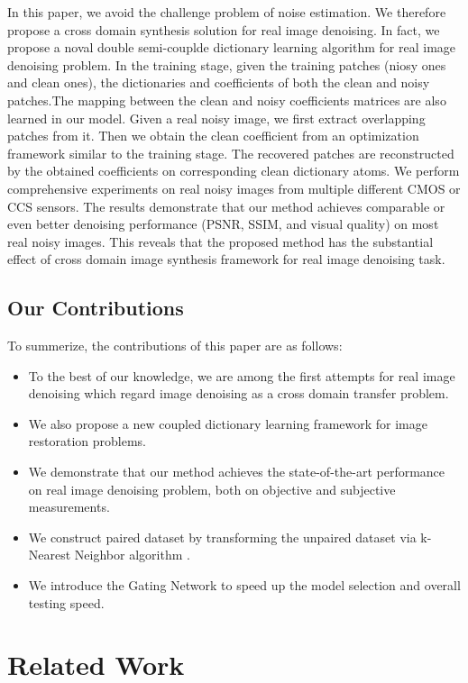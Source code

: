 \documentclass[10pt,twocolumn,letterpaper]{article}
\begin{document}
In this paper, we avoid the challenge problem of noise estimation. We therefore propose a cross domain synthesis solution for real image denoising. In fact, we propose a noval double semi-couplde dictionary learning algorithm for real image denoising problem. In the training stage, given the training patches (niosy ones and clean ones), the dictionaries and coefficients of both the clean and noisy patches.The mapping between the clean and noisy coefficients matrices are also learned in our model. Given a real noisy image, we first extract overlapping patches from it. Then we obtain the clean coefficient from an optimization framework similar to the training stage. The recovered patches are reconstructed by the obtained coefficients on corresponding clean dictionary atoms. We perform comprehensive experiments on real noisy images from multiple different CMOS or CCS sensors. The results demonstrate that our method achieves comparable or even better denoising performance (PSNR, SSIM, and visual quality) on most real noisy images. This reveals that the proposed method has the substantial effect of cross domain image synthesis framework for real image denoising task.

\subsection{Our Contributions}
To summerize, the contributions of this paper are as follows:

\begin{itemize}
\item To the best of our knowledge, we are among the first attempts for real image denoising which regard image denoising as a cross domain transfer problem.
\item We also propose a new coupled dictionary learning framework for image restoration problems.
\item We demonstrate that our method achieves the state-of-the-art performance on real image denoising problem, both on objective and subjective measurements.
\item We construct paired dataset by transforming the unpaired dataset via k-Nearest Neighbor algorithm \cite{knn}.
\item We introduce the Gating Network to speed up the model selection and overall testing speed.
\end{itemize}

\section{Related Work}
\end{document}
